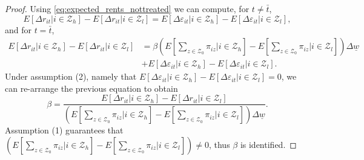 \documentclass{article}
\newcommand{\Z}{\mathcal{Z}}
\newcommand{\mw}{\underline{w}}
\begin{document}
\begin{proof}
    Using \eqref{eq:expected_rents_nottreated} we can compute, for $t\neq \bar{t}$,
    \begin{equation*}
        E[\Delta r_{it} | i\in\Z_h] - E[\Delta r_{it} | i\in\Z_l] = 
        E[\Delta \varepsilon_{it} | i\in\Z_h] - E[\Delta \varepsilon_{it} | i\in\Z_l] ,
    \end{equation*}
    and for $t = \bar{t}$,
    \begin{equation*}
        \begin{split}
            E[\Delta r_{it} | i\in\Z_h] - E[\Delta r_{it} | i\in\Z_l] 
            & = \beta \left(E\left[\sum_{z\in\Z_0}\pi_{iz} \Big| i\in\Z_h\right]
                           - E\left[\sum_{z\in\Z_0}\pi_{iz} \Big| i\in\Z_l\right]\right) \Delta \mw  \\
            & + E[\Delta \varepsilon_{it} | i\in\Z_h] - E[\Delta \varepsilon_{it} | i\in\Z_l] .
        \end{split}
    \end{equation*}
    Under assumption (2), namely that 
    $E[\Delta \varepsilon_{it} | i\in\Z_h] 
     - E[\Delta \varepsilon_{it} | i\in\Z_l] = 0$,
    we can re-arrange the previous equation to obtain
    \begin{equation}\label{eq:id_beta}
        \beta = \frac{E[\Delta r_{it} | i\in\Z_h] - E[\Delta r_{it} | i\in\Z_l]}
                     {\left(E[\sum_{z\in\Z_0}\pi_{iz} | i\in\Z_h] - E[\sum_{z\in\Z_0}\pi_{iz} | i\in\Z_l]\right) \Delta \mw}.
    \end{equation}
    Assumption (1) guarantees that 
    $\left(E[\sum_{z\in\Z_0}\pi_{iz} | i\in\Z_h] 
          - E[\sum_{z\in\Z_0}\pi_{iz} | i\in\Z_l]\right) \neq 0$,  
    thus $\beta$ is identified.


\end{proof}
\end{document}
